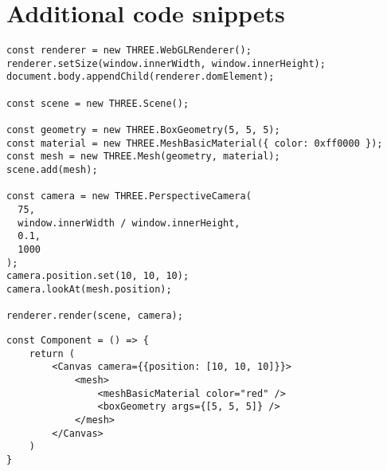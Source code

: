 \chapter{Additional code snippets} 

\begin{lstlisting}[caption={~Creating and displaying a 3D red cube with Three.js},label={lst:threejs},captionpos=t,float,abovecaptionskip=-\medskipamount,belowcaptionskip=\medskipamount]
const renderer = new THREE.WebGLRenderer();
renderer.setSize(window.innerWidth, window.innerHeight);
document.body.appendChild(renderer.domElement);

const scene = new THREE.Scene();

const geometry = new THREE.BoxGeometry(5, 5, 5);
const material = new THREE.MeshBasicMaterial({ color: 0xff0000 });
const mesh = new THREE.Mesh(geometry, material);
scene.add(mesh);

const camera = new THREE.PerspectiveCamera(
  75,
  window.innerWidth / window.innerHeight,
  0.1,
  1000
);
camera.position.set(10, 10, 10);
camera.lookAt(mesh.position);

renderer.render(scene, camera);

\end{lstlisting}


\begin{lstlisting}[caption={~Creating a 3D red cube as a React component with R3F},label={lst:r3f},captionpos=t,float,abovecaptionskip=-\medskipamount,belowcaptionskip=\medskipamount]
const Component = () => {
    return (
        <Canvas camera={{position: [10, 10, 10]}}>
            <mesh>
                <meshBasicMaterial color="red" />
                <boxGeometry args={[5, 5, 5]} />
            </mesh>
        </Canvas>
    )
}
\end{lstlisting}
